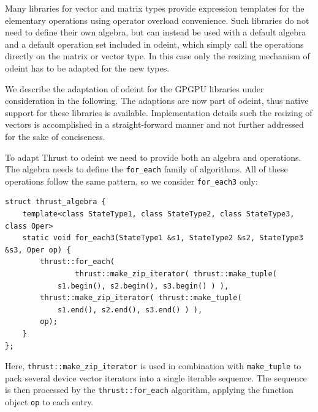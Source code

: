 \documentclass[final]{siamltex}
\newcommand{\code}[1]{\lstinline|#1|}
\begin{document}
Many libraries for vector and matrix types provide expression
templates \cite{Veldhuizen:ExpressionTemplates, Veldhuizen:Techniques,
Vandevoorde:CppTemplates} for the elementary operations using operator overload
convenience.
Such libraries do not need to define their own algebra,
but can instead be used with a default algebra
and a default operation set included in odeint,
which simply call the operations directly on the matrix or vector type.
In this case only the resizing mechanism of odeint has to be adapted for the new types.

We describe the adaptation of odeint for the GPGPU libraries under consideration
in the following. The adaptions are now part of odeint, thus native support
for these libraries is available.
Implementation details such the resizing of vectors is accomplished in a straight-forward manner
and not further addressed for the sake of conciseness.

To adapt Thrust to odeint we need to provide both an algebra and
operations. The algebra needs to define the \code{for_each} family of
algorithms. All of these operations follow the same pattern,
so we consider \code{for_each3} only:
\begin{lstlisting}
struct thrust_algebra {
    template<class StateType1, class StateType2, class StateType3, class Oper>
    static void for_each3(StateType1 &s1, StateType2 &s2, StateType3 &s3, Oper op) {
        thrust::for_each(
                thrust::make_zip_iterator( thrust::make_tuple(
		    s1.begin(), s2.begin(), s3.begin() ) ),
		thrust::make_zip_iterator( thrust::make_tuple( 
		    s1.end(), s2.end(), s3.end() ) ),
		op);
    }
};
\end{lstlisting}
Here, \code{thrust::make_zip_iterator} is used in combination with \code{make_tuple} 
to pack several device vector iterators into a single iterable sequence.
The sequence is then processed by the \code{thrust::for_each} algorithm, applying the function object
\code{op} to each entry.
\end{document}
